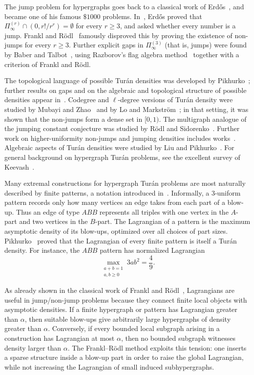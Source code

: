 \documentclass[10pt]{article}
\numberwithin{equation}{section}
\theoremstyle{definition}
\theoremstyle{remark}
\begin{document}
The jump problem for hypergraphs goes back to a classical work of Erd\H{o}s~\cite{Erdos64}, and became one of his famous $\$1000$ problems. In~\cite{Erdos64}, Erd\H{o}s proved that $\Pi^{(r)}_\infty\cap(0,r!/r^r)=\emptyset$ for every $r\ge3$, and asked whether every number is a jump. Frankl and R\"odl~\cite{FranklRodl84} famously disproved this by proving the existence of non-jumps for every $r\ge3$. Further explicit gaps in $\Pi^{(3)}_\infty$ (that is, jumps) were found by Baber and Talbot~\cite{BaberTalbot11}, using Razborov's flag algebra method~\cite{Raz07} together with a criterion of Frankl and R\"odl.

The topological language of possible Tur\'an densities was developed by Pikhurko~\cite{Pikhurko14}; further results on gaps and on the algebraic and topological structure of possible densities appear in~\cite{BrownSimonovits84,Grosu16,Pikhurko15}.  Codegree and $\ell$-degree versions of Tur\'an density were studied by Mubayi and Zhao~\cite{MubayiZhao07} and by Lo and Markstr\"om~\cite{LoMarkstrom14}; in that setting, it was shown that the non-jumps form a dense set in $[0,1)$.  The multigraph analogue of the jumping constant conjecture was studied by R\"odl and Sidorenko~\cite{RodlSidorenko95}.  Further work on higher-uniformity non-jumps and jumping densities includes works~\cite{Peng07NonJumping4Uniform,Peng09JumpingDensities,Peng08LagrangiansI,Peng07LagrangiansII,HouLiYangZhang24}.  Algebraic aspects of Tur\'an densities were studied by Liu and Pikhurko~\cite{LiuPikhurko23}.  For general background on hypergraph Tur\'an problems, see the excellent survey of Keevash~\cite{Keevash11}.

Many extremal constructions for hypergraph Tur\'an problems are most naturally described by finite patterns, a notation introduced in~\cite{Pikhurko14}.  Informally, a $3$-uniform pattern records only how many vertices an edge takes from each part of a blow-up.  Thus an edge of type $ABB$ represents all triples with one vertex in the $A$-part and two vertices in the $B$-part.  The Lagrangian of a pattern is the maximum asymptotic density of its blow-ups, optimized over all choices of part sizes. Pikhurko~\cite{Pikhurko14} proved that the Lagrangian of every finite pattern is itself a Tur\'an density. For instance, the $ABB$ pattern has normalized Lagrangian
\[
        \max_{\substack{a+b=1\\ a,b\ge0}} 3ab^2=\frac49.
\]

As already shown in the classical work of Frankl and R\"odl~\cite{FranklRodl84}, Lagrangians are useful in jump/non-jump problems because they connect finite local objects with asymptotic densities.  If a finite hypergraph or pattern has Lagrangian greater than $\alpha$, then suitable blow-ups give arbitrarily large hypergraphs of density greater than $\alpha$.  Conversely, if every bounded local subgraph arising in a construction has Lagrangian at most $\alpha$, then no bounded subgraph witnesses density larger than $\alpha$.  The Frankl--R\"odl method exploits this tension: one inserts a sparse structure inside a blow-up part in order to raise the global Lagrangian, while not increasing the Lagrangian of small induced subhypergraphs.
\end{document}
